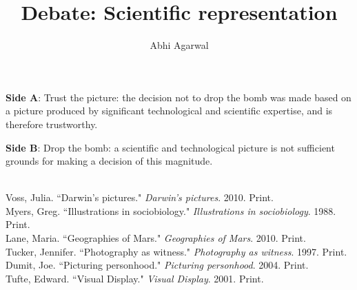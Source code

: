 \documentclass[11pt, oneside]{article}
\title{Debate: Scientific representation\vspace{-0.4cm}}
\author{Abhi Agarwal\vspace{-1cm}}
\date{}
\begin{document}
\maketitle

\noindent \textbf{Side A}: Trust the picture: the decision not to drop the bomb was made based on a picture produced by significant technological and scientific expertise, and is therefore trustworthy.




\newpage

\noindent \textbf{Side B}: Drop the bomb: a scientific and technological picture is not sufficient grounds for making a decision of this magnitude.


\begin{workscited}
\bibent \\
\bibent Voss, Julia. ``Darwin's pictures."  \textit{Darwin's pictures}.  2010. Print. \\
\bibent Myers, Greg. ``Illustrations in sociobiology."  \textit{Illustrations in sociobiology}.  1988. Print. \\
\bibent Lane, Maria. ``Geographies of Mars."  \textit{Geographies of Mars}.  2010. Print. \\
\bibent Tucker, Jennifer. ``Photography as witness."  \textit{Photography as witness}.  1997. Print. \\
\bibent Dumit, Joe. ``Picturing personhood."  \textit{Picturing personhood}.  2004. Print. \\
\bibent Tufte, Edward. ``Visual Display."  \textit{Visual Display}.  2001. Print. \\
\end{workscited}
\end{document}
